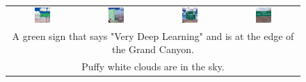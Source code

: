 \begin{figure}[ht!]
\begin{tabular}{cccc}
        \includegraphics[width=0.24\textwidth]{figures/scaling_comparison/dl_0.jpg} &
        \includegraphics[width=0.24\textwidth]{figures/scaling_comparison/dl_1.jpg} &
        \includegraphics[width=0.24\textwidth]{figures/scaling_comparison/dl_2.jpg} &
        \includegraphics[width=0.24\textwidth]{figures/scaling_comparison/dl_3.jpg}\vspace{1mm} \\
        \multicolumn{4}{c}{\small A green sign that says "Very Deep Learning" and is at the edge of the Grand Canyon.}\\
        \multicolumn{4}{c}{\small Puffy white clouds are in the sky.}\vspace{3mm}\\


\end{tabular}
\end{figure}
